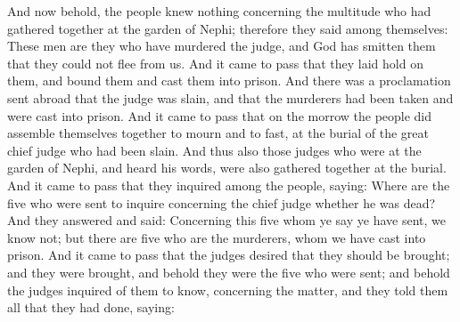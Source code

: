 And now behold, the people knew nothing concerning the multitude who had gathered together at the garden of Nephi; therefore they said among themselves: These men are they who have murdered the judge, and God has smitten them that they could not flee from us.
\bverse \iffalse And it came to pass that they laid hold on them, and bound them and cast them into prison. And there was a proclamation sent abroad that the judge was slain, and that the murderers had been taken and were cast into prison. \fi
And it came to pass that they laid hold on them, and bound them and cast them into prison. And there was a proclamation sent abroad that the judge was slain, and that the murderers had been taken and were cast into prison.
\bverse \iffalse And it came to pass that on the morrow the people did assemble themselves together to mourn and to fast, at the burial of the great chief judge who had been slain. \fi
And it came to pass that on the morrow the people did assemble themselves together to mourn and to fast, at the burial of the great chief judge who had been slain.
\bverse \iffalse And thus also those judges who were at the garden of Nephi, and heard his words, were also gathered together at the burial. \fi
And thus also those judges who were at the garden of Nephi, and heard his words, were also gathered together at the burial.
\bverse \iffalse And it came to pass that they inquired among the people, saying: Where are the five who were sent to inquire concerning the chief judge whether he was dead? And they answered and said: Concerning this five whom ye say ye have sent, we know not; but there are five who are the murderers, whom we have cast into prison. \fi
And it came to pass that they inquired among the people, saying: Where are the five who were sent to inquire concerning the chief judge whether he was dead? And they answered and said: Concerning this five whom ye say ye have sent, we know not; but there are five who are the murderers, whom we have cast into prison.
\bverse \iffalse And it came to pass that the judges desired that they should be brought; and they were brought, and behold they were the five who were sent; and behold the judges inquired of them to know, concerning the matter, and they told them all that they had done, saying: \fi
And it came to pass that the judges desired that they should be brought; and they were brought, and behold they were the five who were sent; and behold the judges inquired of them to know, concerning the matter, and they told them all that they had done, saying:
